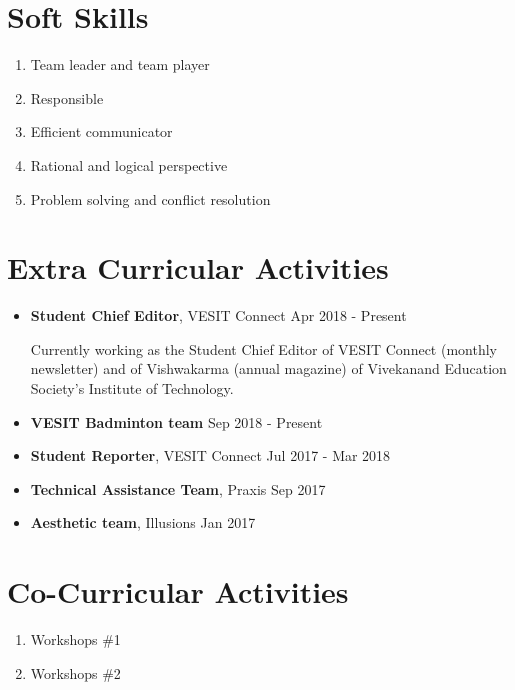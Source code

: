 \documentclass[margin]{res}
\begin{document}
\begin{resume}
\section{Soft Skills}
\begin{enumerate}
  \item Team leader and team player
  \item Responsible
  \item Efficient communicator
  \item Rational and logical perspective
  \item Problem solving and conflict resolution
\end{enumerate}

\section{Extra Curricular Activities}
\begin{itemize}
  \item {\bf Student Chief Editor}, VESIT Connect \hfill Apr 2018 - Present
  
  Currently working as the Student Chief Editor of VESIT Connect (monthly newsletter) and of Vishwakarma (annual magazine)  of Vivekanand Education Society's Institute of Technology. 
  \item {\bf VESIT Badminton team} \hfill Sep 2018 - Present
  \item {\bf Student Reporter}, VESIT Connect \hfill Jul 2017 - Mar 2018
  \item {\bf Technical Assistance Team}, Praxis \hfill Sep 2017
  \item {\bf Aesthetic team}, Illusions \hfill Jan 2017
\end{itemize}

\section{Co-Curricular Activities}
\begin{enumerate}
\item Workshops \#1
\item Workshops \#2
\end{enumerate}


\end{resume}
\end{document}
